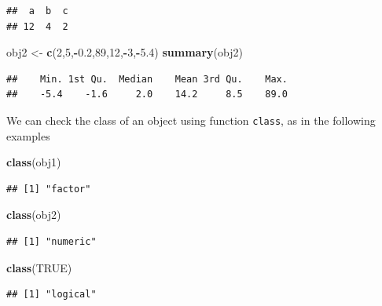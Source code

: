 \documentclass[]{book}
\newenvironment{Shaded}{\begin{snugshade}}{\end{snugshade}}
\newcommand{\KeywordTok}[1]{\textcolor[rgb]{0.13,0.29,0.53}{\textbf{#1}}}
\newcommand{\DecValTok}[1]{\textcolor[rgb]{0.00,0.00,0.81}{#1}}
\newcommand{\FloatTok}[1]{\textcolor[rgb]{0.00,0.00,0.81}{#1}}
\newcommand{\StringTok}[1]{\textcolor[rgb]{0.31,0.60,0.02}{#1}}
\newcommand{\OtherTok}[1]{\textcolor[rgb]{0.56,0.35,0.01}{#1}}
\newcommand{\OperatorTok}[1]{\textcolor[rgb]{0.81,0.36,0.00}{\textbf{#1}}}
\newcommand{\NormalTok}[1]{#1}
\theoremstyle{definition}
\theoremstyle{definition}
\theoremstyle{remark}
\begin{document}
\begin{verbatim}
##  a  b  c 
## 12  4  2
\end{verbatim}

\begin{Shaded}
\begin{Highlighting}[]
\NormalTok{obj2 <-}\StringTok{ }\KeywordTok{c}\NormalTok{(}\DecValTok{2}\NormalTok{,}\DecValTok{5}\NormalTok{,}\OperatorTok{-}\FloatTok{0.2}\NormalTok{,}\DecValTok{89}\NormalTok{,}\DecValTok{12}\NormalTok{,}\OperatorTok{-}\DecValTok{3}\NormalTok{,}\OperatorTok{-}\FloatTok{5.4}\NormalTok{)}
\KeywordTok{summary}\NormalTok{(obj2)}
\end{Highlighting}
\end{Shaded}

\begin{verbatim}
##    Min. 1st Qu.  Median    Mean 3rd Qu.    Max. 
##    -5.4    -1.6     2.0    14.2     8.5    89.0
\end{verbatim}

We can check the class of an object using function \texttt{class}, as in
the following examples

\begin{Shaded}
\begin{Highlighting}[]
\KeywordTok{class}\NormalTok{(obj1)}
\end{Highlighting}
\end{Shaded}

\begin{verbatim}
## [1] "factor"
\end{verbatim}

\begin{Shaded}
\begin{Highlighting}[]
\KeywordTok{class}\NormalTok{(obj2)}
\end{Highlighting}
\end{Shaded}

\begin{verbatim}
## [1] "numeric"
\end{verbatim}

\begin{Shaded}
\begin{Highlighting}[]
\KeywordTok{class}\NormalTok{(}\OtherTok{TRUE}\NormalTok{)}
\end{Highlighting}
\end{Shaded}

\begin{verbatim}
## [1] "logical"
\end{verbatim}
\end{document}
